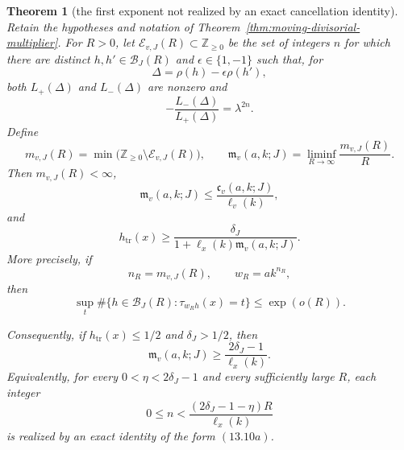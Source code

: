 \documentclass[11pt,reqno]{amsart}
\newtheorem{theorem}{Theorem}[section]
\theoremstyle{definition}
\theoremstyle{remark}
\newcommand{\Z}{\mathbb Z}
\newcommand{\Tr}{\operatorname{tr}}
\begin{document}
\begin{theorem}[the first exponent not realized by an exact cancellation identity]
\label{thm:first-missing-resonance}
Retain the hypotheses and notation of
Theorem~\ref{thm:moving-divisorial-multiplier}.  For \(R>0\), let
\(\mathcal E_{v,J}(R)\subset\Z_{\ge0}\) be the set of integers \(n\) for
which there are distinct \(h,h'\in\mathcal B_J(R)\) and
\(\epsilon\in\{1,-1\}\) such that, for
\[
 \Delta=\rho(h)-\epsilon\rho(h'),
\]
both \(L_+(\Delta)\) and \(L_-(\Delta)\) are nonzero and
\[
 -\frac{L_-(\Delta)}{L_+(\Delta)}=\lambda^{2n}.
\tag{13.10a}
\]
Define
\[
 m_{v,J}(R)=
 \min\bigl(\Z_{\ge0}\setminus\mathcal E_{v,J}(R)\bigr),
 \qquad
 \mathfrak m_v(a,k;J)=
 \liminf_{R\to\infty}\frac{m_{v,J}(R)}R.
\tag{13.10b}
\]
Then \(m_{v,J}(R)<\infty\),
\[
 \mathfrak m_v(a,k;J)
 \le \frac{\mathfrak c_v(a,k;J)}{\ell_v(k)},
\tag{13.10c}
\]
and
\[
 h_{\Tr}(x)\ge
 \frac{\delta_J}
 {1+\ell_x(k)\mathfrak m_v(a,k;J)}.
\tag{13.10d}
\]
More precisely, if
\[
 n_R=m_{v,J}(R),\qquad w_R=ak^{n_R},
\]
then
\[
 \sup_t
 \#\{h\in\mathcal B_J(R):\tau_{w_Rh}(x)=t\}
 \le\exp(o(R)).
\tag{13.10e}
\]

Consequently, if \(h_{\Tr}(x)\le1/2\) and \(\delta_J>1/2\), then
\[
 \mathfrak m_v(a,k;J)\ge
 \frac{2\delta_J-1}{\ell_x(k)}.
\tag{13.10f}
\]
Equivalently, for every \(0<\eta<2\delta_J-1\) and every sufficiently
large \(R\), each integer
\[
 0\le n<
 \frac{(2\delta_J-1-\eta)R}{\ell_x(k)}
\tag{13.10g}
\]
is realized by an exact identity of the form \((13.10a)\).
\end{theorem}
\end{document}
